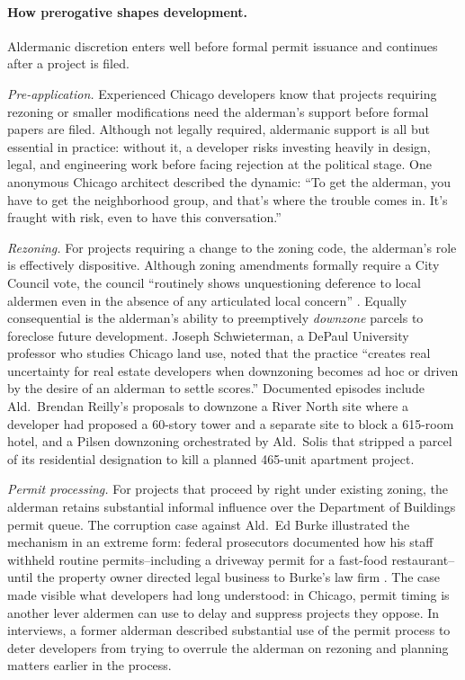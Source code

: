\paragraph{How prerogative shapes development.}
Aldermanic
discretion enters well before formal permit issuance and continues after a project is filed.

\textit{Pre-application.}
Experienced Chicago developers know that projects requiring rezoning or smaller
modifications need the alderman's support before formal papers are filed.
Although not legally required, aldermanic support is all but essential in practice: without it, a
developer risks investing heavily in design, legal, and engineering work
before facing rejection at the political stage.
One anonymous Chicago architect
described the dynamic: ``To get the alderman, you have to get the neighborhood
group, and that's where the trouble comes in.
It's fraught with risk, even to have
this conversation.''
\citep{giangreco_game_2024}

\textit{Rezoning.}
For projects requiring a change to the zoning code, the
alderman's role is effectively dispositive.
Although zoning amendments formally
require a City Council vote, the council ``routinely shows unquestioning deference
to local aldermen even in the absence of any articulated local concern''
\citep{chase_chicago_2023}.
Equally consequential is the alderman's ability to
preemptively \textit{downzone} parcels to foreclose future development.
Joseph
Schwieterman, a DePaul University professor who studies Chicago land use, noted
that the practice ``creates real uncertainty for real estate developers when
downzoning becomes ad hoc or driven by the desire of an alderman to settle scores.''
\citep{gallun_ad_2019} Documented episodes include Ald.\ Brendan Reilly's
proposals to downzone a River North site where a developer had proposed a 60-story
tower and a separate site to block a 615-room hotel, and a Pilsen downzoning
orchestrated by Ald.\ Solis that stripped a parcel of its residential designation
to kill a planned 465-unit apartment project.

\textit{Permit processing.}
For projects that proceed by right under existing
zoning, the alderman retains substantial informal influence over the Department of
Buildings permit queue.
The corruption case against Ald.\ Ed Burke illustrated the
mechanism in an extreme form: federal prosecutors documented how his staff
withheld routine permits--including a driveway permit for a fast-food
restaurant--until the property owner directed legal business to Burke's law firm
\citep{spielman_aldermen_2019}.
The case made visible what developers had long
understood: in Chicago, permit timing is another lever aldermen can use to delay and suppress
projects they oppose.
In interviews, a former alderman described substantial use of the permit process to deter developers from trying to overrule the alderman on rezoning and planning matters earlier in the process.

